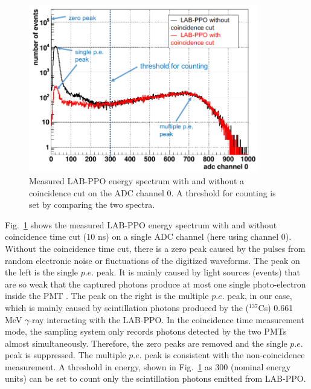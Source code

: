 \begin{figure}[htbp]
	\centering	
	\includegraphics[width=10cm]{TeLScoinCut.png}
	\caption[Measured LAB-PPO energy spectrum with and without coincidence cut.]{Measured LAB-PPO energy spectrum with and without a coincidence cut on the ADC channel 0. A threshold for counting is set by comparing the two spectra.}
	\label{teLScoinCut}
\end{figure}

Fig.~\ref{teLScoinCut} shows the measured LAB-PPO energy spectrum with and without coincidence time cut ($10$ ns) on a single ADC channel (here using channel 0). Without the coincidence time cut, there is a zero peak caused by the pulses from random electronic noise or fluctuations of the digitized waveforms. The peak on the left is the single $p.e.$ peak. It is mainly caused by light sources (events) that are so weak that the captured photons produce at most one single photo-electron inside the PMT \cite{leo2012techniques}. The peak on the right is the multiple $p.e.$ peak, in our case, which is mainly caused by scintillation photons produced by the ($^{137}$Cs) 0.661 MeV $\gamma$-ray interacting with the LAB-PPO. In the coincidence time measurement mode, the sampling system only records photons detected by the two PMTs almost simultaneously. Therefore, the zero peaks are removed and the single $p.e.$ peak is suppressed. The multiple $p.e.$ peak is consistent with the non-coincidence measurement. A threshold in energy, shown in Fig.~\ref{teLScoinCut} as 300 (nominal energy units) can be set to count only the scintillation photons emitted from LAB-PPO. 

